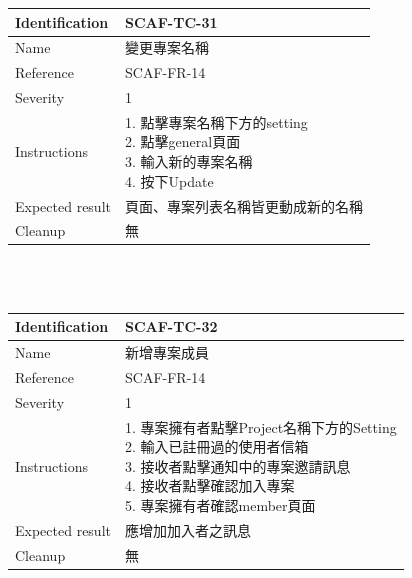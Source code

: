 \documentclass{report}
\begin{document}
\begin{tabularx}{\textwidth}{
  |p{}%
  |p{}|%
  }
  \hline
  \centering Identification &  SCAF-TC-31 \\
  \hline
  \centering Name & 變更專案名稱 \\
  \hline
  \centering Reference & SCAF-FR-14 \\
  \hline
  \centering Severity & 1 \\
  \hline
  \centering Instructions & 
  \makecell[l]{
    1. 點擊專案名稱下方的setting \\
    2. 點擊general頁面 \\
    3. 輸入新的專案名稱 \\
    4. 按下Update 
  }\\
  \hline
  \centering Expected result & 頁面、專案列表名稱皆更動成新的名稱 \\
  \hline
  \centering Cleanup & 無 \\
  \hline
\end{tabularx}
\\
\newline
\\
\begin{tabularx}{\textwidth}{
  |p{}%
  |p{}|%
  }
  \hline
  \centering Identification &  SCAF-TC-32 \\
  \hline
  \centering Name & 新增專案成員 \\
  \hline
  \centering Reference & SCAF-FR-14 \\
  \hline
  \centering Severity & 1 \\
  \hline
  \centering Instructions & 
  \makecell[l]{
    1. 專案擁有者點擊Project名稱下方的Setting \\
    2. 輸入已註冊過的使用者信箱 \\
    3. 接收者點擊通知中的專案邀請訊息 \\
    4. 接收者點擊確認加入專案 \\
    5. 專案擁有者確認member頁面
  }\\
  \hline
  \centering Expected result & 應增加加入者之訊息 \\
  \hline
  \centering Cleanup & 無 \\
  \hline
\end{tabularx}
\\
\newline
\end{document}
